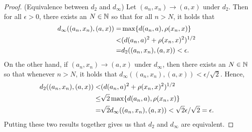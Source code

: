 \begin{proof}
(Equivalence between $d_2$ and $d_\infty$) Let $(a_n,x_n)\to (a,x)$ under $d_2$. Then for all $\epsilon>0$, there exists an $N\in\mathbb{N}$ so that for all $n>N$, it holds that 
\begin{align*}
    d_\infty((a_n,x_n),(a,x)) 
    =& \max\{d(a_n,a),\rho(x_n,x)\}\\
    <& (d(a_n,a)^2+\rho(x_n,x)^2)^{1/2}\\
    =& d_2((a_n,x_n),(a,x)) <\epsilon.
\end{align*}
On the other hand, if $(a_n,x_n)\to (a,x)$ under $d_\infty$, then there exists an $N\in\mathbb{N}$ so that whenever $n>N$, it holds that $d_\infty((a_n,x_n),(a,x)) <\epsilon/\sqrt{2}$. Hence,
\begin{align*}
    d_2((a_n,x_n),(a,x)) 
    <& (d(a_n,a)^2+\rho(x_n,x)^2)^{1/2}\\
    \leq& \sqrt{2}\max\{d(a_n,a),\rho(x_n,x)\}\\
    =& \sqrt{2}d_\infty((a_n,x_n),(a,x)) <\sqrt{2}\epsilon/\sqrt{2} = \epsilon.
\end{align*}
Putting these two results together gives us that $d_2$ and $d_\infty$ are equivalent.
\end{proof} 
